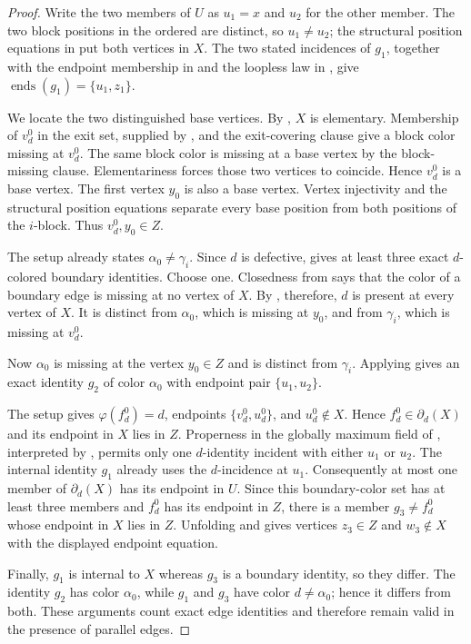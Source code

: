 \begin{proof}
Write the two members of $U$ as $u_1=x$ and $u_2$ for the other member.
The two block positions in the ordered  are
distinct, so $u_1\ne u_2$; the structural position equations in
 put both
vertices in $X$.  The two stated incidences of $g_1$, together with the
endpoint membership in  and the loopless law in
, give
$\operatorname{ends}(g_1)=\{u_1,z_1\}$.

We locate the two distinguished base vertices.  By
, $X$ is elementary.  Membership of
$v^0_d$ in the exit set, supplied by ,
and the exit-covering clause give a block color missing at $v^0_d$.
The same block color is missing at a base vertex by the block-missing
clause.  Elementariness forces those two vertices to coincide.  Hence
$v^0_d$ is a base vertex.  The first vertex $y_0$ is also a base vertex.
Vertex injectivity and the structural position equations separate every
base position from both positions of the $i$-block.  Thus
$v^0_d,y_0\in Z$.

The setup  already states
$\alpha_0\ne\gamma_i$.  Since $d$ is defective,
 gives at least three exact
$d$-colored boundary identities.  Choose one.  Closedness from
 says that the color of a boundary
edge is missing at no vertex of $X$.  By ,
therefore, $d$ is present at every
vertex of $X$.  It is distinct from $\alpha_0$, which is missing at
$y_0$, and from $\gamma_i$, which is missing at $v^0_d$.

Now $\alpha_0$ is missing at the vertex $y_0\in Z$ and is distinct from
$\gamma_i$.  Applying  gives an
exact identity $g_2$ of color $\alpha_0$ with endpoint pair
$\{u_1,u_2\}$.

The setup gives
$\varphi(f^0_d)=d$, endpoints $\{v^0_d,u^0_d\}$, and
$u^0_d\notin X$.  Hence $f^0_d\in\partial_d(X)$ and its endpoint in
$X$ lies in $Z$.  Properness in the globally maximum field of
, interpreted by
, permits only one $d$-identity incident
with either $u_1$ or $u_2$.  The internal identity $g_1$ already uses the
$d$-incidence at $u_1$.  Consequently at most one member of
$\partial_d(X)$ has its endpoint in $U$.  Since this boundary-color set
has at least three members and $f^0_d$ has its endpoint in $Z$, there is
a member $g_3\ne f^0_d$ whose endpoint in $X$ lies in $Z$.  Unfolding
 and  gives vertices
$z_3\in Z$ and $w_3\notin X$ with the displayed endpoint equation.

Finally, $g_1$ is internal to $X$ whereas $g_3$ is a boundary identity,
so they differ.  The identity $g_2$ has color $\alpha_0$, while $g_1$
and $g_3$ have color $d\ne\alpha_0$; hence it differs from both.  These
arguments count exact edge identities and therefore remain valid in the
presence of parallel edges.
\end{proof}
